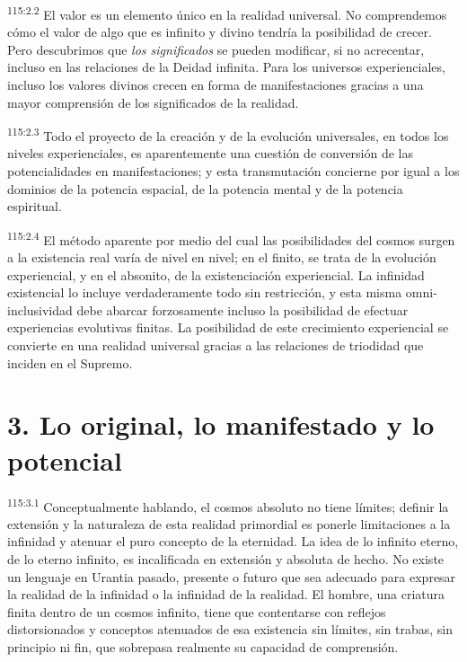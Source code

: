 \documentclass[twoside, 11pt]{book}
\begin{document}
\par
\textsuperscript{115:2.2} El valor es un elemento único en la realidad universal. No comprendemos cómo el valor de algo que es infinito y divino tendría la posibilidad de crecer. Pero descubrimos que \textit{los significados} se pueden modificar, si no acrecentar, incluso en las relaciones de la Deidad infinita. Para los universos experienciales, incluso los valores divinos crecen en forma de manifestaciones gracias a una mayor comprensión de los significados de la realidad.

\par
\textsuperscript{115:2.3} Todo el proyecto de la creación y de la evolución universales, en todos los niveles experienciales, es aparentemente una cuestión de conversión de las potencialidades en manifestaciones; y esta transmutación concierne por igual a los dominios de la potencia espacial, de la potencia mental y de la potencia espiritual.

\par
\textsuperscript{115:2.4} El método aparente por medio del cual las posibilidades del cosmos surgen a la existencia real varía de nivel en nivel; en el finito, se trata de la evolución experiencial, y en el absonito, de la existenciación experiencial. La infinidad existencial lo incluye verdaderamente todo sin restricción, y esta misma omni-inclusividad debe abarcar forzosamente incluso la posibilidad de efectuar experiencias evolutivas finitas. La posibilidad de este crecimiento experiencial se convierte en una realidad universal gracias a las relaciones de triodidad que inciden en el Supremo.

\section*{3. Lo original, lo manifestado y lo potencial}
\par
\textsuperscript{115:3.1} Conceptualmente hablando, el cosmos absoluto no tiene límites; definir la extensión y la naturaleza de esta realidad primordial es ponerle limitaciones a la infinidad y atenuar el puro concepto de la eternidad. La idea de lo infinito eterno, de lo eterno infinito, es incalificada en extensión y absoluta de hecho. No existe un lenguaje en Urantia pasado, presente o futuro que sea adecuado para expresar la realidad de la infinidad o la infinidad de la realidad. El hombre, una criatura finita dentro de un cosmos infinito, tiene que contentarse con reflejos distorsionados y conceptos atenuados de esa existencia sin límites, sin trabas, sin principio ni fin, que sobrepasa realmente su capacidad de comprensión.
\end{document}
